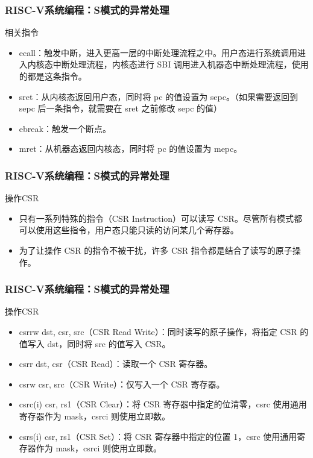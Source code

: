 
\begin{frame}
    \frametitle{RISC-V系统编程：S模式的异常处理}
    
    相关指令
    \begin{itemize}
        \item ecall：触发中断，进入更高一层的中断处理流程之中。用户态进行系统调用进入内核态中断处理流程，内核态进行 SBI 调用进入机器态中断处理流程，使用的都是这条指令。
        \item sret：从内核态返回用户态，同时将 pc 的值设置为 sepc。（如果需要返回到 sepc 后一条指令，就需要在 sret 之前修改 sepc 的值）
        \item ebreak：触发一个断点。
        \item mret：从机器态返回内核态，同时将 pc 的值设置为 mepc。
        
    \end{itemize}
\end{frame}


\begin{frame}
    \frametitle{RISC-V系统编程：S模式的异常处理}
    
    操作CSR
    \begin{itemize}
        \item 只有一系列特殊的指令（CSR Instruction）可以读写 CSR。尽管所有模式都可以使用这些指令，用户态只能只读的访问某几个寄存器。
        \item 为了让操作 CSR 的指令不被干扰，许多 CSR 指令都是结合了读写的原子操作。

        
    \end{itemize}
\end{frame}


\begin{frame}
    \frametitle{RISC-V系统编程：S模式的异常处理}
    
    操作CSR
    \begin{itemize}
        \item csrrw dst, csr, src（CSR Read Write）：同时读写的原子操作，将指定 CSR 的值写入 dst，同时将 src 的值写入 CSR。
        \item csrr dst, csr（CSR Read）：读取一个 CSR 寄存器。
        \item csrw csr, src（CSR Write）：仅写入一个 CSR 寄存器。
        \item csrc(i) csr, rs1（CSR Clear）：将 CSR 寄存器中指定的位清零，csrc 使用通用寄存器作为 mask，csrci 则使用立即数。
        \item csrs(i) csr, rs1（CSR Set）：将 CSR 寄存器中指定的位置 1，csrc 使用通用寄存器作为 mask，csrci 则使用立即数。
    \end{itemize}
\end{frame}

